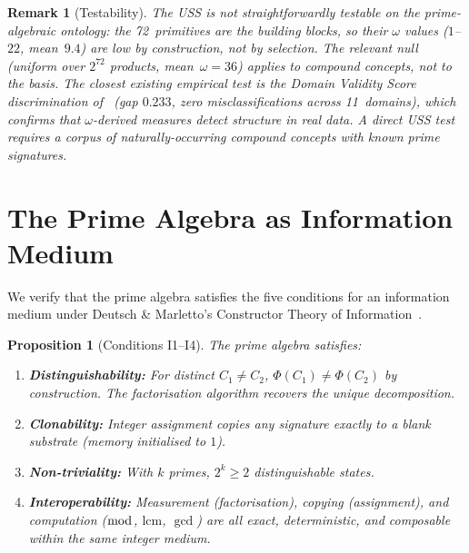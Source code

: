 \documentclass[11pt,a4paper]{article}
\newtheorem{proposition}[theorem]{Proposition}
\newtheorem{remark}[theorem]{Remark}
\begin{document}
\begin{remark}[Testability]
The USS is not straightforwardly testable on the prime-algebraic
ontology: the 72~primitives \emph{are} the building blocks, so
their $\omega$ values ($1$--$22$, mean~$9.4$) are low by
construction, not by selection. The relevant null (uniform over
$2^{72}$ products, mean~$\omega=36$) applies to \emph{compound
concepts}, not to the basis. The closest existing empirical test
is the Domain Validity Score discrimination of~\citet{p4} (gap
$0.233$, zero misclassifications across 11~domains), which
confirms that $\omega$-derived measures detect structure in real
data. A direct USS test requires a corpus of naturally-occurring
compound concepts with known prime signatures.
\end{remark}

\section{The Prime Algebra as Information Medium}
\label{sec:ct}

We verify that the prime algebra satisfies the five conditions for
an information medium under Deutsch \& Marletto's Constructor
Theory of Information~\citep{deutsch2015}.

\begin{proposition}[Conditions I1--I4]
\label{prop:ct}
The prime algebra satisfies:
\begin{enumerate}[nosep]
\item[\textbf{I1}] \textbf{Distinguishability:} For distinct
  $C_1\neq C_2$, $\Phi(C_1)\neq\Phi(C_2)$ by construction.
  The factorisation algorithm recovers the unique decomposition.
\item[\textbf{I2}] \textbf{Clonability:} Integer assignment copies
  any signature exactly to a blank substrate (memory initialised
  to $1$).
\item[\textbf{I3}] \textbf{Non-triviality:} With $k$ primes,
  $2^k\geq2$ distinguishable states.
\item[\textbf{I4}] \textbf{Interoperability:} Measurement
  (factorisation), copying (assignment), and computation
  ($\bmod$, $\mathrm{lcm}$, $\gcd$) are all exact, deterministic,
  and composable within the same integer medium.
\end{enumerate}
\end{proposition}
\end{document}
